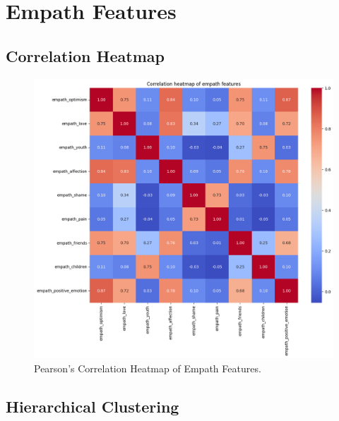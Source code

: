 

\section{Empath Features}

\subsection*{Correlation Heatmap}
\label{sec:correlationheatmapsspotifyfeatures}

\begin{center}
\begin{figure}[H]
  \centering
  \includegraphics[width=6in]{img/corr_heatmap_empath.png}
  \caption{Pearson's Correlation Heatmap of Empath Features.}
  \label{Figure:corr_heatmap_empath}
\end{figure}
\end{center}

\subsection*{Hierarchical Clustering}
\label{sec:hierarchicalclustering}

